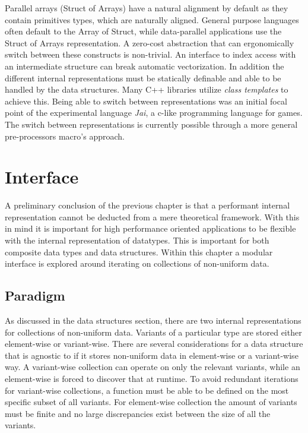 \documentclass{article}
\begin{document}
Parallel arrays (Struct of Arrays) have a natural alignment by default as they contain primitives types, which are naturally aligned.
General purpose languages often default to the Array of Struct, while data-parallel applications use the Struct of Arrays representation.
A zero-cost abstraction that can ergonomically switch between these constructs is non-trivial.
An interface to index access with an intermediate structure can break automatic vectorization\cite{abstraction-vectorization}. 
In addition the different internal representations must be statically definable and able to be handled by the data structures.
Many C++ libraries utilize {\it class templates} to achieve this\cite{abstraction-vectorization}.
Being able to switch between representations was an initial focal point of the experimental language {\it Jai}, a c-like programming language for games.
The switch between representations is currently possible through a more general pre-processors macro's approach.

\newpage

\section{Interface}

A preliminary conclusion of the previous chapter is that a performant internal representation cannot be deducted from a mere theoretical framework.
With this in mind it is important for high performance oriented applications to be flexible with the internal representation of datatypes.
This is important for both composite data types and data structures.
Within this chapter a modular interface is explored around iterating on collections of non-uniform data.

\subsection{Paradigm}

As discussed in the data structures section, there are two internal representations for collections of non-uniform data.
Variants of a particular type are stored either element-wise or variant-wise.
There are several considerations for a data structure that is agnostic to if it stores non-uniform data in element-wise or a variant-wise way.
A variant-wise collection can operate on only the relevant variants, while an element-wise is forced to discover that at runtime.
To avoid redundant iterations for variant-wise collections, a function must be able to be defined on the most specific subset of all variants.
For element-wise collection the amount of variants must be finite and no large discrepancies exist between the size of all the variants.
\end{document}
